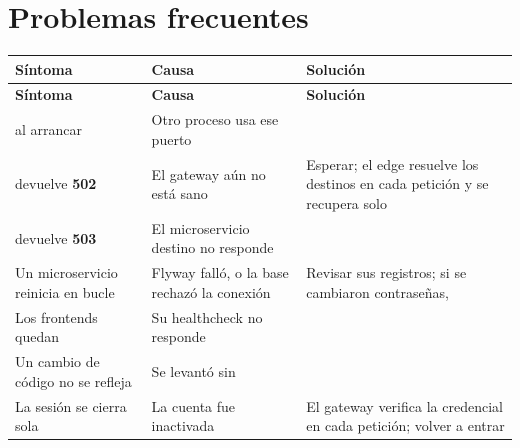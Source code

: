 
\section{Problemas frecuentes}

\begin{center}
\small
\begin{xltabular}{\textwidth}{@{}L{4.2cm} L{4.2cm} Y@{}}
\toprule
\textbf{Síntoma} & \textbf{Causa} & \textbf{Solución} \\
\midrule
\endfirsthead
\toprule
\textbf{Síntoma} & \textbf{Causa} & \textbf{Solución} \\
\midrule
\endhead
{} al arrancar &
  Otro proceso usa ese puerto &
   \\
 devuelve \textbf{502} &
  El gateway aún no está sano &
  Esperar; el edge resuelve los destinos en cada petición y se recupera solo \\
 devuelve \textbf{503} &
  El microservicio destino no responde &
   \\
Un microservicio reinicia en bucle &
  Flyway falló, o la base rechazó la conexión &
  Revisar sus registros; si se cambiaron contraseñas,  \\
Los frontends quedan  &
  Su healthcheck no responde &
   \\
Un cambio de código no se refleja &
  Se levantó sin  &
   \\
La sesión se cierra sola &
  La cuenta fue inactivada &
  El gateway verifica la credencial en cada petición; volver a entrar \\
\bottomrule
\end{xltabular}
\end{center}

